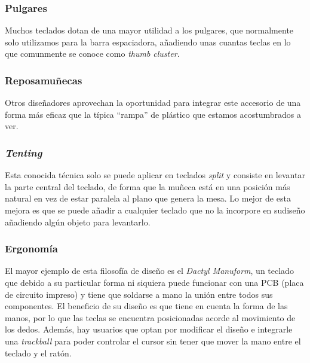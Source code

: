   \subsubsection{Pulgares}
  Muchos teclados dotan de una mayor utilidad a los pulgares, que normalmente solo utilizamos para la barra espaciadora, añadiendo unas cuantas teclas en lo que comunmente se conoce como \textit{thumb cluster}.

  \subsubsection{Reposamuñecas}
  Otros diseñadores aprovechan la oportunidad para integrar este accesorio de una forma más eficaz que la típica ``rampa'' de plástico que estamos acostumbrados a ver.

  \subsubsection{\textit{Tenting}}
  Esta conocida técnica solo se puede aplicar en teclados \textit{split} y consiste en levantar la parte central del teclado, de forma que la muñeca está en una posición más natural en vez de estar paralela al plano que genera la mesa. Lo mejor de esta mejora es que se puede añadir a cualquier teclado que no la incorpore en sudiseño añadiendo algún objeto para levantarlo.

  \subsubsection{Ergonomía}
  El mayor ejemplo de esta filosofía de diseño es el \textit{Dactyl Manuform}, un teclado que debido a su particular forma ni siquiera puede funcionar con una PCB (placa de circuito impreso) y tiene que soldarse a mano la unión entre todos sus componentes. El beneficio de su diseño es que tiene en cuenta la forma de las manos, por lo que las teclas se encuentra posicionadas acorde al movimiento de los dedos. Además, hay usuarios que optan por modificar el diseño e integrarle una \textit{trackball} para poder controlar el cursor sin tener que mover la mano entre el teclado y el ratón.
